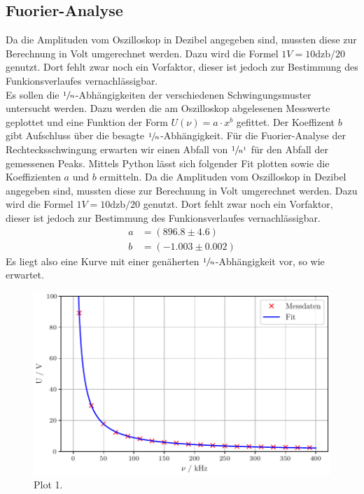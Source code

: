 \subsection{Fuorier-Analyse}
Da die Amplituden vom Oszilloskop in Dezibel angegeben sind, mussten diese zur Berechnung in Volt umgerechnet werden.
Dazu wird die Formel $1V=10{\text{dzb}/20}$ genutzt. Dort fehlt zwar noch ein Vorfaktor, dieser ist jedoch zur Bestimmung
des Funkionsverlaufes vernachlässigbar.\\
Es sollen die $\sfrac{1}{n}$-Abhängigkeiten der verschiedenen Schwingungsmuster untersucht werden. Dazu werden die am Oszilloskop 
abgelesenen Messwerte geplottet und eine Funktion der Form $U(\nu)=a\cdot x^b$ gefittet. Der Koeffizent $b$ gibt Aufschluss über die 
besagte $\sfrac{1}{n}$-Abhängigkeit. Für die Fuorier-Analyse der Rechtecksschwingung erwarten wir einen Abfall von $\sfrac{1}{n^1}$
für den Abfall der gemessenen Peaks. Mittels Python lässt sich folgender Fit plotten sowie die Koeffizienten $a$ und $b$ ermitteln.
Da die Amplituden vom Oszilloskop in Dezibel angegeben sind, mussten diese zur Berechnung in Volt umgerechnet werden.
Dazu wird die Formel $1V=10{\text{dzb}/20}$ genutzt. Dort fehlt zwar noch ein Vorfaktor, dieser ist jedoch zur Bestimmung
des Funkionsverlaufes vernachlässigbar. 
\begin{align*}
  a &= (896.8 ± 4.6)\\
  b &= (-1.003 ± 0.002)
\end{align*}
Es liegt also eine Kurve mit einer genäherten $\sfrac{1}{n}$-Abhängigkeit vor, so wie erwartet.
\begin{figure}[H]
  \centering
  \includegraphics[scale=0.6]{plota.pdf}
  \caption{Plot 1.}
  \label{fig:Plot1}
\end{figure}\noindent
